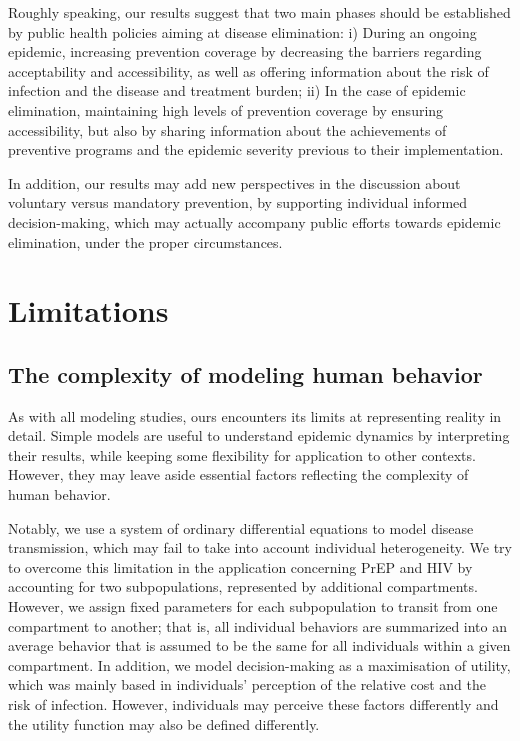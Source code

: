 Roughly speaking, our results suggest that two main phases should be established by public health policies aiming at disease elimination: i) During an ongoing epidemic, increasing prevention coverage by decreasing the barriers regarding acceptability and accessibility, as well as offering information about the risk of infection and the disease and treatment burden; ii) In the case of epidemic elimination, maintaining high levels of prevention coverage by ensuring accessibility, but also by sharing information about  the achievements of preventive programs and the epidemic severity previous to their implementation. 

In addition, our results may add new perspectives in the discussion about voluntary versus mandatory prevention, by supporting individual informed decision-making, which may actually accompany public efforts towards epidemic elimination, under the proper circumstances.

\section{Limitations}
\subsection{The complexity of modeling human behavior}
As with all modeling studies, ours encounters its limits at representing reality in detail. Simple models are useful to understand epidemic dynamics by interpreting their results, while keeping some flexibility for application to other contexts. However, they may leave aside essential factors reflecting the complexity of human behavior. 

Notably, we use a system of ordinary differential equations to model disease transmission, which may fail to take into account individual heterogeneity. We try to overcome this limitation in the application concerning PrEP and HIV by accounting for two subpopulations, represented by additional compartments. However, we assign fixed parameters for each subpopulation to transit from one compartment to another; that is, all individual behaviors are summarized into an average behavior that is assumed to be the same for all individuals within a given compartment. In addition, we model decision-making as a maximisation of utility, which was mainly based in individuals' perception of the relative cost and the risk of infection. However, individuals may perceive these factors differently and the utility function may also be defined differently. 

